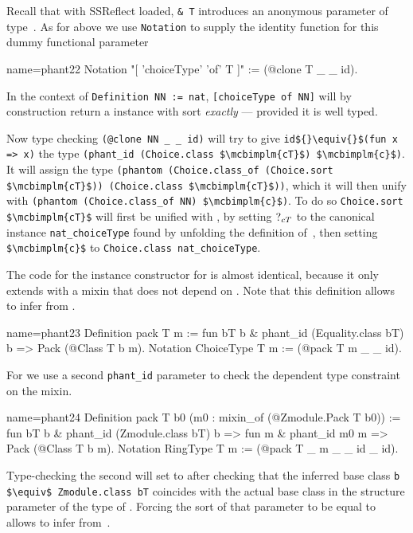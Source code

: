 Recall that with {\sc SSReflect} loaded, \lstinline/& T/
introduces an anonymous parameter of type~. As for 
above we use \lstinline/Notation/ to supply the identity function
for this dummy functional parameter

\begin{coq}{name=phant22}{}
Notation "[ 'choiceType' 'of' T ]" := (@clone T _ _ id).
\end{coq}

In the context of \lstinline/Definition NN := nat/,
\lstinline/[choiceType of NN]/ will by construction return a 
instance with sort \emph{exactly}  --- provided it is well typed.

Now type checking
\lstinline/(@clone NN _ _ id)/ will try to give
\lstinline/id${}\equiv{}$(fun x => x)/ the type
\lstinline/(phant_id (Choice.class $\mcbimplm{cT}$) $\mcbimplm{c}$)/.
It will assign  the type
\lstinline/(phantom (Choice.class_of (Choice.sort $\mcbimplm{cT}$)) (Choice.class $\mcbimplm{cT}$))/,
which it will then unify with \lstinline/(phantom (Choice.class_of NN) $\mcbimplm{c}$)/.
To do so \lstinline/Choice.sort $\mcbimplm{cT}$/
will first be unified with ,
by setting $\mbox{?}_{cT}$ to the canonical instance
\lstinline/nat_choiceType/ found by unfolding the definition of~,
then setting \lstinline/$\mcbimplm{c}$/
to \lstinline/Choice.class nat_choiceType/.

The code for the instance constructor for  is almost
identical, because it only extends  with a mixin that does
not depend on .
Note that this definition allows \Coq{} to infer  from .

\begin{coq}{name=phant23}{}
Definition pack T m :=
  fun bT b & phant_id (Equality.class bT) b => Pack (@Class T b m).
Notation ChoiceType T m := (@pack T m _ _ id).
\end{coq}

For  we use a second \lstinline/phant_id/  parameter
to check the dependent type constraint on the mixin.

\begin{coq}{name=phant24}{}
Definition pack T b0 (m0 : mixin_of (@Zmodule.Pack T b0)) :=
  fun bT b & phant_id (Zmodule.class bT) b =>
  fun    m & phant_id m0 m => Pack (@Class T b m).
Notation RingType T m := (@pack T _ m _ _ id _ id).
\end{coq}

Type-checking the second  will set  to  after
checking that the inferred base class \lstinline/b $\equiv$ Zmodule.class bT/
coincides with the actual base class  in the structure parameter
of the type of .  Forcing the sort of that parameter to be equal
to  allows \Coq{} to infer  from~.

